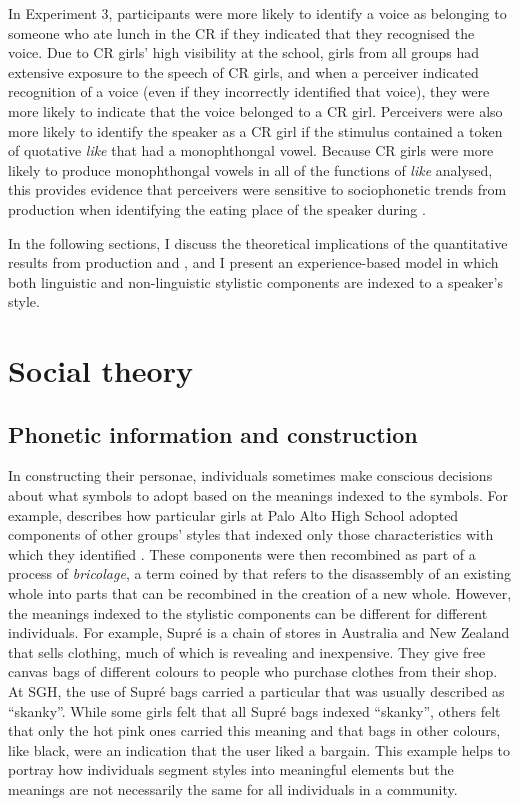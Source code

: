In Experiment 3, participants were more likely to identify a voice as belonging to someone who ate lunch in the CR if they indicated that they recognised the voice.  Due to CR girls' high visibility at the school, girls from all groups had extensive exposure to the speech of CR girls, and when a perceiver indicated recognition of a voice (even if they incorrectly identified that voice), they were more likely to indicate that the voice belonged to a CR girl.   Perceivers were also more likely to identify the speaker as a CR girl if the stimulus contained a token of quotative \textit{like} that had a monophthongal vowel.  Because CR girls were more likely to produce monophthongal vowels in all of the functions of \textit{like} analysed, this provides evidence that perceivers were sensitive to sociophonetic trends from production when identifying the eating place of the speaker during .

In the following sections, I discuss the theoretical implications of the quantitative results from production and , and I present an experience-based model in which both linguistic and non-linguistic stylistic components are indexed to a speaker's style.


\section{Social theory}

\subsection{Phonetic information and  construction}

In constructing their personae, individuals sometimes make conscious decisions about what symbols to adopt based on the meanings indexed to the symbols.  For example, \citet{eckert2008} describes how particular girls at Palo Alto High School adopted components of other groups' styles that indexed only those characteristics with which they identified \citep[457]{eckert2008}.  These components were then recombined as part of a process of \textit{bricolage}, a term coined by \citet{levistrauss} that refers to the disassembly of an existing whole into parts that can be recombined in the creation of a new whole. However, the meanings indexed to the stylistic components can be different for different individuals.  For example, Supr\'{e} is a chain of stores in Australia and New Zealand that sells clothing, much of which is revealing and inexpensive.  They give free canvas bags of different colours to people who purchase clothes from their shop.  At SGH, the use of Supr\'{e} bags carried a particular  that was usually described as ``skanky''.  While some girls felt that all Supr\'{e} bags indexed ``skanky'', others felt that only the hot pink ones carried this meaning and that bags in other colours, like black, were an indication that the user liked a bargain.  This example helps to portray how individuals segment styles into meaningful elements but the meanings are not necessarily the same for all individuals in a community.  

